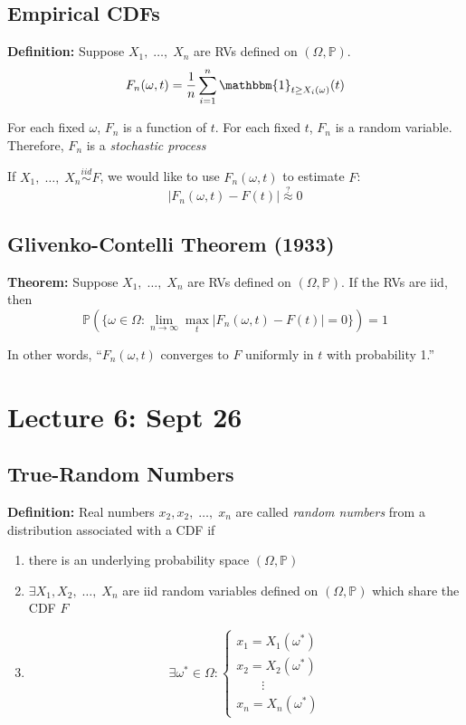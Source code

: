 \documentclass[12pt]{article}
\renewcommand{\P}{\mathbb{P}}
\newcommand{\ind}{\mathbbm{1}}
\newcommand{\ellipsis}{\; \dots, \;}
\begin{document}
\subsection*{Empirical CDFs}
\textbf{Definition:} Suppose $X_1, \ellipsis X_n$ are RVs defined on $(\Omega, \P)$. 
\[F_n(\omega, t) = \frac{1}{n}\sum_{i=1}^n \ind_{t \geq X_i(\omega)}(t)\]

For each fixed $\omega$, $F_n$ is a function of $t$. For each fixed $t$, $F_n$ is a random variable. Therefore, $F_n$ is a \emph{stochastic process}

If $X_1, \ellipsis X_n \overset{iid}{\sim} F$, we would like to use $F_n(\omega, t)$ to estimate $F$:
\[|F_n(\omega, t) - F(t)| \overset{?}{\approx} 0\]

\subsection*{Glivenko-Contelli Theorem (1933)}
\textbf{Theorem:} Suppose $X_1, \ellipsis X_n$ are RVs defined on $(\Omega, \P)$. If the RVs are iid, then 
\[\P(\{\omega \in \Omega: \lim_{n\to \infty} \max_t|F_n(\omega, t) - F(t)| = 0\}) = 1\]

In other words, ``$F_n(\omega, t)$ converges to $F$ uniformly in $t$ with probability 1.''

\section*{Lecture 6: Sept 26}
\subsection*{True-Random Numbers}
\textbf{Definition:} Real numbers $x_2, x_2, \ellipsis x_n$ are called \emph{random numbers} from a distribution associated with a CDF if 
\begin{enumerate}
    \item there is an underlying probability space $(\Omega, \P)$
    \item $\exists X_1, X_2, \ellipsis X_n$ are iid random variables defined on $(\Omega, \P)$ which share the CDF $F$
    \item 
    \[\exists \omega^* \in \Omega: \begin{cases}
        x_1 = X_1(\omega^*)\\
        x_2 = X_2(\omega^*)\\
        \qquad \vdots\\
        x_n = X_n(\omega^*)
    \end{cases}\]
\end{enumerate}
\end{document}
